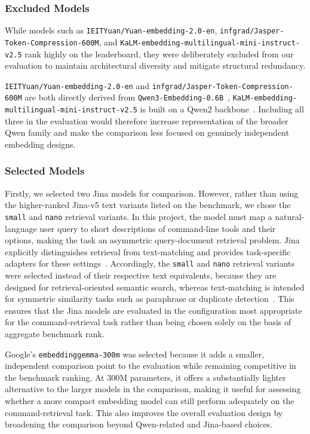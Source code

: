 \subsubsection{Excluded Models}

While models such as \texttt{IEITYuan/Yuan-embedding-2.0-en}, \texttt{infgrad/Jasper-Token-Compression-600M}, and \texttt{KaLM-embedding-multilingual-mini-instruct-v2.5} rank highly on the leaderboard, they were deliberately excluded from our evaluation to maintain architectural diversity and mitigate structural redundancy.

\texttt{IEITYuan/Yuan-embedding-2.0-en} and \texttt{infgrad/Jasper-Token-Compression-600M} are both directly derived from \texttt{Qwen3-Embedding-0.6B}~\cite{ieityuan_yuan_embedding_20_2025, zhang2025jasper}, \texttt{KaLM-embedding-multilingual-mini-instruct-v2.5} is built on a Qwen2 backbone~\cite{zhao2026kalmembeddingv2, hu2025kalmembedding}. Including all three in the evaluation would therefore increase representation of the broader Qwen family and make the comparison less focused on genuinely independent embedding designs.

\subsubsection{Selected Models}

Firstly, we selected two Jina models for comparison. However, rather than using the higher-ranked Jina-v5 text variants listed on the benchmark, we chose the \texttt{small} and \texttt{nano} retrieval variants. In this project, the model must map a natural-language user query to short descriptions of command-line tools and their options, making the task an asymmetric query-document retrieval problem. Jina explicitly distinguishes retrieval from text-matching and provides task-specific adapters for these settings~\cite{akram2026jina}. Accordingly, the \texttt{small} and \texttt{nano} retrieval variants were selected instead of their respective text equivalents, because they are designed for retrieval-oriented semantic search, whereas text-matching is intended for symmetric similarity tasks such as paraphrase or duplicate detection~\cite{akram2026jina}. This ensures that the Jina models are evaluated in the configuration most appropriate for the command-retrieval task rather than being chosen solely on the basis of aggregate benchmark rank.

Google's \texttt{embeddinggemma-300m} was selected because it adds a smaller, independent comparison point to the evaluation while remaining competitive in the benchmark ranking. At 300M parameters, it offers a substantially lighter alternative to the larger models in the comparison, making it useful for assessing whether a more compact embedding model can still perform adequately on the command-retrieval task. This also improves the overall evaluation design by broadening the comparison beyond Qwen-related and Jina-based choices.


